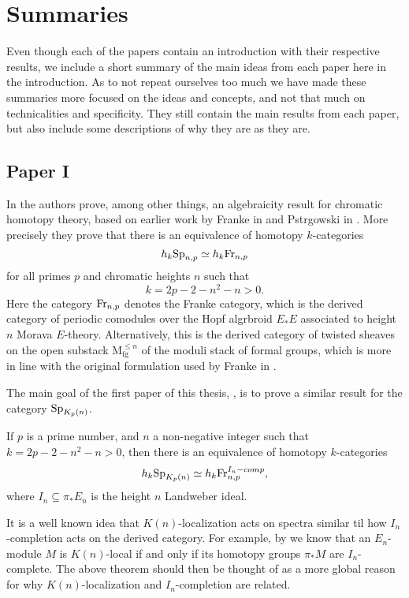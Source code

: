 \section{Summaries}

Even though each of the papers contain an introduction with their respective results, we include a short summary of the main ideas from each paper here in the introduction. As to not repeat ourselves too much we have made these summaries more focused on the ideas and concepts, and not that much on technicalities and specificity. They still contain the main results from each paper, but also include some descriptions of why they are as they are. 

\subsection{Paper I}

In \cite{patchkoria-pstragowski_2021} the authors prove, among other things, an algebraicity result for chromatic homotopy theory, based on earlier work by Franke in \cite{franke_96} and Pstr\a{}gowski in \cite{pstragowski_2021}. More precisely they prove that there is an equivalence of homotopy $k$-categories 
\[h_k \mathrm{Sp}_{n,p} \simeq h_k \mathrm{Fr}_{n,p}\]
for all primes $p$ and chromatic heights $n$ such that 
\[k = 2p-2-n^2-n > 0.\] 
Here the category $\mathrm{Fr}_{n,p}$ denotes the Franke category, which is the derived category of periodic comodules over the Hopf algrbroid $E_*E$ associated to height $n$ Morava $E$-theory. Alternatively, this is the derived category of twisted sheaves on the open substack $\mathrm{M}_{\mathrm{fg}}^{\leq n}$ of the moduli stack of formal groups, which is more in line with the original formulation used by Franke in \cite{franke_96}. 

The main goal of the first paper of this thesis, \cite{aambo_2024_algebraicity}, is to prove a similar result for the category $\mathrm{Sp}_{{K_p(n)}}$. 

\begin{theorem}
    \label{ch0:summary1:thm:main}
    If $p$ is a prime number, and $n$ a non-negative integer such that $k = 2p-2-n^2-n > 0$, then there is an equivalence of homotopy $k$-categories 
    \[h_k \mathrm{Sp}_{{K_p(n)}} \simeq h_k\mathrm{Fr}_{n,p}^{I_n-comp},\]
    where $I_n \subseteq \pi_* E_n$ is the height $n$ Landweber ideal. 
\end{theorem}

It is a well known idea that $K(n)$-localization acts on spectra similar til how $I_n$-completion acts on the derived category. For example, by \cite[3.14]{barthel-frankland_15} we know that an $E_n$-module $M$ is $K(n)$-local if and only if its homotopy groups $\pi_* M$ are $I_n$-complete. The above theorem should then be thought of as a more global reason for why $K(n)$-localization and $I_n$-completion are related. 

